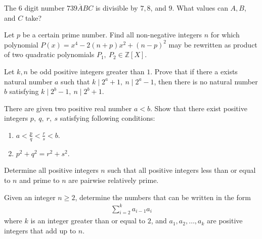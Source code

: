 \documentclass[problems.tex]{subfile}
\begin{document}
	\begin{problem}
		The $6$ digit number $\overline{739ABC}$ is divisible by $7, 8$, and $9$. What values can $A, B$, and $C$ take?
	\end{problem}

	\begin{problem}
		Let $p$ be a certain prime number. Find all non-negative integers $n$ for which polynomial $P(x)=x^4-2(n+p)x^2+(n-p)^2$ may be rewritten as product of two quadratic polynomials $P_1, \ P_2 \in \mathbb{Z}[X]$. %
	\end{problem}

	\begin{problem}
		Let $k, n$ be odd positive integers greater than $1$. Prove that if there a exists natural number $a$ such that $k\mid 2^a+1, \ n\mid 2^a-1$, then there is no natural number $b$ satisfying $k\mid 2^b-1, \ n\mid 2^b+1$. %
	\end{problem}

	\begin{problem}
		There are given two positive real number $a<b$. Show that there exist positive integers $p, \ q, \ r, \ s$ satisfying following conditions:
		\begin{enumerate}
			\item $a< \frac{p}{q} < \frac{r}{s} < b$.
			\item $p^2+q^2=r^2+s^2$.
		\end{enumerate}
	\end{problem}

	\begin{problem}
		Determine all positive integers $n$ such that all positive integers less than or equal to $n$ and prime to $n$ are pairwise relatively prime.
	\end{problem}

	\begin{problem}
		Given an integer $n \geq 2$, determine the numbers that can be written in
		the form
			\begin{align*}
				\sum_{i=2}^{k} a_{i-1}a_i
			\end{align*}
		where $k$ is an integer greater than or equal to $2$, and $a_1,a_2,\dots, a_k$ are positive integers that add up to $n$.
	\end{problem}
\end{document}
